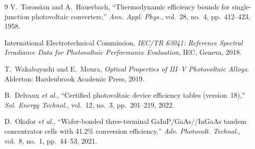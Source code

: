 \documentclass[10pt,twocolumn]{article}
\begin{document}
\begin{thebibliography}{9}
\small
{}
  V.~Torossian and A.~Hauerbach,
  ``Thermodynamic efficiency bounds for single-junction photovoltaic converters,''
  \textit{Ann. Appl. Phys.}, vol.~28, no.~4, pp.~412--423, 1958.

  International Electrotechnical Commission,
  \textit{IEC/TR 63041: Reference Spectral Irradiance Data for Photovoltaic
  Performance Evaluation}, IEC, Geneva, 2018.

  T.~Wakabayashi and E.~Moura,
  \textit{Optical Properties of III--V Photovoltaic Alloys}.
  Alderton: Hardenbrook Academic Press, 2019.

  B.~Delvaux \textit{et al.},
  ``Certified photovoltaic device efficiency tables (version~18),''
  \textit{Sol. Energy Technol.}, vol.~12, no.~3, pp.~201--219, 2022.

  D.~Okafor \textit{et al.},
  ``Wafer-bonded three-terminal GaInP/GaAs//InGaAs tandem concentrator cells
  with 41.2\% conversion efficiency,''
  \textit{Adv. Photovolt. Technol.}, vol.~8, no.~1, pp.~44--53, 2021.
\end{thebibliography}
\end{document}
